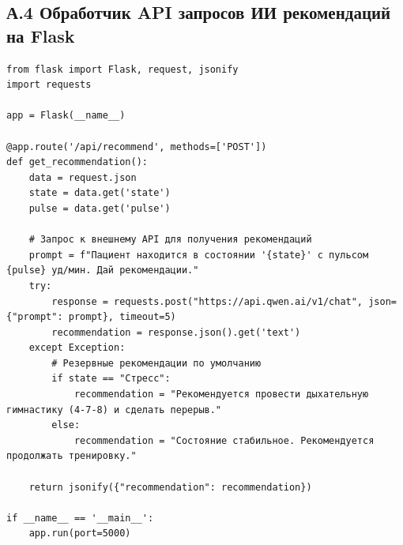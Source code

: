 \documentclass[utf8, russian]{eskdtext}
\begin{document}
\subsection*{А.4 Обработчик API запросов ИИ рекомендаций на Flask}
\begin{verbatim}
from flask import Flask, request, jsonify
import requests

app = Flask(__name__)

@app.route('/api/recommend', methods=['POST'])
def get_recommendation():
    data = request.json
    state = data.get('state')
    pulse = data.get('pulse')
    
    # Запрос к внешнему API для получения рекомендаций
    prompt = f"Пациент находится в состоянии '{state}' с пульсом {pulse} уд/мин. Дай рекомендации."
    try:
        response = requests.post("https://api.qwen.ai/v1/chat", json={"prompt": prompt}, timeout=5)
        recommendation = response.json().get('text')
    except Exception:
        # Резервные рекомендации по умолчанию
        if state == "Стресс":
            recommendation = "Рекомендуется провести дыхательную гимнастику (4-7-8) и сделать перерыв."
        else:
            recommendation = "Состояние стабильное. Рекомендуется продолжать тренировку."
            
    return jsonify({"recommendation": recommendation})

if __name__ == '__main__':
    app.run(port=5000)
\end{verbatim}
\end{document}
